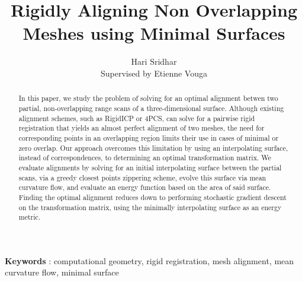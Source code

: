 \documentclass[letterpaper, 10 pt, conference]{ieeeconf}  %
\title{\LARGE \bf
Rigidly Aligning Non Overlapping Meshes using Minimal Surfaces
}
\author{Hari Sridhar \\ \indent Supervised by Etienne Vouga}
\begin{document}
\maketitle
\thispagestyle{empty}
\pagestyle{empty}


\begin{abstract}

In this paper, we study the problem of solving for an optimal alignment betwen two partial, non-overlapping range scans of a three-dimensional surface. Although existing alignment schemes, such as RigidICP or 4PCS, can solve for a pairwise rigid registration that yields an almost perfect alignment of two meshes, the need for corresponding points in an overlapping region limits their use in cases of minimal or zero overlap. Our approach overcomes this limitation by using an interpolating surface, instead of correspondences, to determining an optimal transformation matrix. We evaluate alignments by solving for an initial interpolating surface between the partial scans, via a greedy closest points zippering scheme, evolve this surface via mean curvature flow, and evaluate an energy function based on the area of said surface. Finding the optimal alignment reduces down to performing stochastic gradient descent on the transformation matrix, using the minimally interpolating surface as an energy metric. %
\end{abstract}
\textbf{Keywords} : computational geometry, rigid registration, mesh alignment, mean curvature flow, minimal surface

\end{document}
